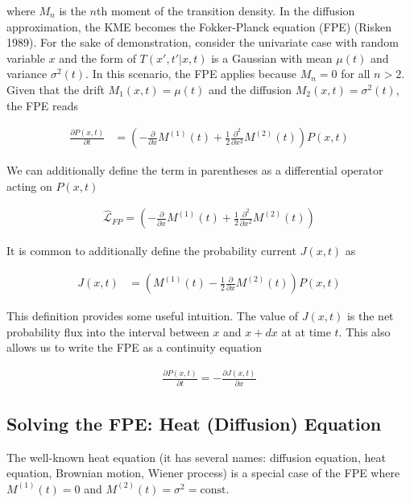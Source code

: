 \documentclass{article}
\begin{document}
where $M_{n}$ is the $n$th moment of the transition density. In the diffusion approximation, the KME becomes the Fokker-Planck equation (FPE) (Risken 1989). For the sake of demonstration, consider the univariate case with random variable $x$ and the form of $T(x',t'|x,t)$ is a Gaussian with mean $\mu(t)$ and variance $\sigma^{2}(t)$. In this scenario, the FPE applies because $M_{n} = 0$ for all $n > 2$. Given that the drift $M_{1}(x,t) = \mu(t)$ and the diffusion $M_{2}(x,t) = \sigma^{2}(t)$, the FPE reads

\begin{align}
\frac{\partial P(x,t)}{\partial t}  &= \left(-\frac{\partial}{\partial x}M^{(1)}(t) + \frac{1}{2}\frac{\partial^{2}}{\partial x^{2}}M^{(2)}(t)\right)P(x,t)
\end{align}

We can additionally define the term in parentheses as a differential operator acting on $P(x,t)$

\begin{align}
\hat{\mathcal{L}}_{FP} = \left(-\frac{\partial}{\partial x}M^{(1)}(t) + \frac{1}{2}\frac{\partial^{2}}{\partial x^{2}}M^{(2)}(t)\right)
\end{align}

It is common to additionally define the probability current $J(x,t)$ as 

\begin{align}
J(x,t)  &= \left(M^{(1)}(t) - \frac{1}{2}\frac{\partial}{\partial x}M^{(2)}(t)\right)P(x,t)
\end{align}

This definition provides some useful intuition. The value of $J(x,t)$ is the net probability flux into the interval between $x$ and $x+dx$ at at time $t$. This also allows us to write the FPE as a continuity equation

\begin{align}
\frac{\partial P(x,t)}{\partial t} = -\frac{\partial J(x,t)}{\partial x}
\end{align}

\subsection{Solving the FPE: Heat (Diffusion) Equation}

The well-known heat equation (it has several names: diffusion equation, heat equation, Brownian motion, Wiener process) is a special case of the FPE where $M^{(1)}(t) = 0$ and $M^{(2)}(t) = \sigma^{2} = \mathrm{const}$. 
\end{document}
